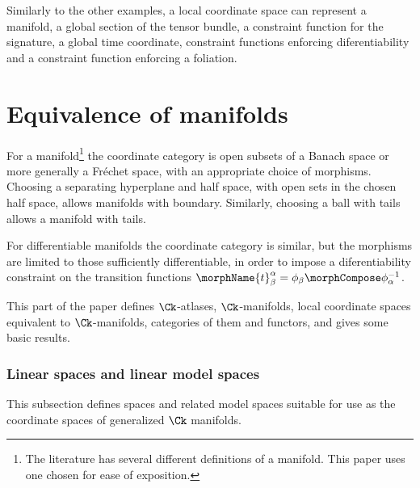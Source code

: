 \documentclass{article}
\begin{document}
\begin{example}
Similarly to the other examples, a local coordinate space can represent
a manifold, a global section of the tensor bundle, a constraint function
for the signature, a global time coordinate, constraint functions
enforcing diferentiability and a constraint function enforcing a foliation.
\end{example}

\part{Equivalence of manifolds}
\label{part:man}
For a manifold\footnote{
  The literature has several different definitions of a manifold.
  This paper uses one chosen for ease of exposition.
}
the coordinate category is open subsets of a Banach space or more
generally a Fr\'echet space, with an appropriate choice of morphisms.
Choosing a separating hyperplane and half space, with open sets in the
chosen half space, allows manifolds with boundary. Similarly, choosing a
ball with tails allows a manifold with tails.

For differentiable manifolds the coordinate category is similar, but the
morphisms are limited to those sufficiently differentiable, in order to
impose a diferentiability constraint on the transition functions
$\morphName{t}^\alpha_\beta=\phi_\beta \morphCompose \phi_\alpha^{-1}$.

This part of the paper defines $\Ck$-atlases, $\Ck$-manifolds, local
coordinate spaces equivalent to $\Ck$-manifolds, categories of them and
functors, and gives some basic results.

\section {Linear spaces and linear model spaces}
{
  \showlabelsinline
  \label{sec:lin}
}

This subsection defines spaces and related model spaces suitable for use
as the coordinate spaces of generalized $\Ck$ manifolds.
\end{document}
